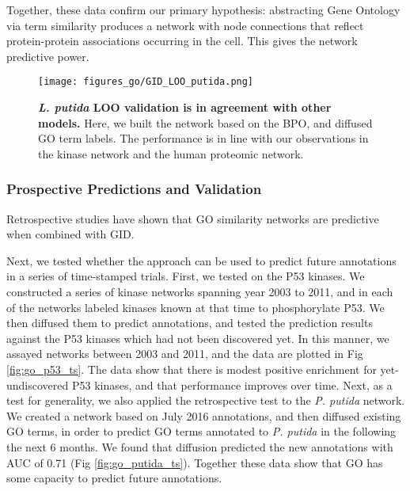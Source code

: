 \documentclass[12pt,a4paper]{report}
\begin{document}
{{Together, these data confirm our primary hypothesis: abstracting Gene Ontology via term similarity produces a network with node connections that reflect protein-protein associations occurring in the cell. This gives the network predictive power.

\begin{figure}
\begin{minipage}[c][\textheight]{\textwidth}
\vspace*{-4in}
\centering
  \texttt{[image: figures\_go/GID\_LOO\_putida.png]}
  \caption[\textit{L. putida} LOO validation.]{\textbf{\textit{L. putida} LOO validation is in agreement with other models.} Here, we built the network based on the BPO, and diffused GO term labels. The performance is in line with our observations in the kinase network and the human proteomic network.}
  \label{fig:go_putida_loo}
  \end{minipage}

\end{figure}

\subsubsection{Prospective Predictions and Validation}

Retrospective studies have shown that GO similarity networks are predictive when combined with GID.

Next, we tested whether the approach can be used to predict future annotations in a series of time-stamped trials. First, we tested on the P53 kinases. We constructed a series of kinase networks spanning year 2003 to 2011, and in each of the networks labeled kinases known at that time to phosphorylate P53. We then diffused them to predict annotations, and tested the prediction results against the P53 kinases which had not been discovered yet. In this manner, we assayed networks between 2003 and 2011, and the data are plotted in Fig \ref{fig:go_p53_ts}. The data show that there is modest positive enrichment for yet-undiscovered P53 kinases, and that performance improves over time. Next, as a test for generality, we also applied the retrospective test to the \textit{P. putida} network. We created a network based on July 2016 annotations, and then diffused existing GO terms, in order to predict GO terms annotated to \textit{P. putida} in the following the next 6 months. We found that diffusion predicted the new annotations with AUC of 0.71 (Fig \ref{fig:go_putida_ts}). Together these data show that GO has some capacity to predict future annotations.

}}
\end{document}
